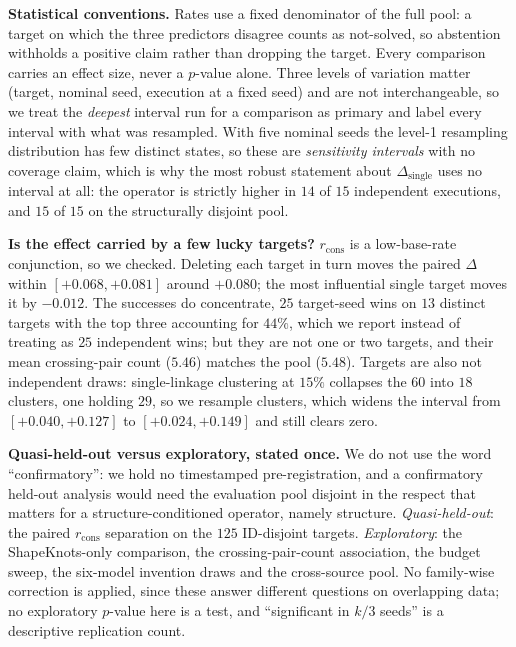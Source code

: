 \documentclass[11pt]{article}
\begin{document}
\smallskip\noindent\textbf{Statistical conventions.} Rates use a fixed denominator of the full pool: a target
on which the three predictors disagree counts as not-solved, so abstention withholds a positive claim rather
than dropping the target. Every comparison carries an effect size, never a $p$-value alone. Three levels of
variation matter (target, nominal seed, execution at a fixed seed) and are not interchangeable, so we treat the
\emph{deepest} interval run for a comparison as primary and label every interval with what was resampled. With
five nominal seeds the level-1 resampling distribution has few distinct states, so these are \emph{sensitivity
intervals} with no coverage claim, which is why the most robust statement about $\Delta_{\mathrm{single}}$ uses
no interval at all: the operator is strictly higher in $14$ of $15$ independent executions, and $15$ of $15$ on
the structurally disjoint pool.

\smallskip\noindent\textbf{Is the effect carried by a few lucky targets?} $r_{\mathrm{cons}}$ is a low-base-rate
conjunction, so we checked. Deleting each target in turn moves the paired $\Delta$ within
$[{+}0.068,{+}0.081]$ around ${+}0.080$; the most influential single target moves it by $-0.012$. The successes
do concentrate, $25$ target-seed wins on $13$ distinct targets with the top three accounting for $44\%$, which we report instead of treating as $25$ independent wins; but they are not one or two targets, and their mean
crossing-pair count ($5.46$) matches the pool ($5.48$). Targets are also not independent draws: single-linkage
clustering at $15\%$ collapses the $60$ into $18$ clusters, one holding $29$, so we resample clusters, which
widens the interval from $[{+}0.040,{+}0.127]$ to $[{+}0.024,{+}0.149]$ and still clears zero.

\smallskip\noindent\textbf{Quasi-held-out versus exploratory, stated once.} We do not use the word
``confirmatory'': we hold no timestamped pre-registration, and a confirmatory held-out analysis would need the
evaluation pool disjoint in the respect that matters for a structure-conditioned operator, namely structure.
\emph{Quasi-held-out}: the paired $r_{\mathrm{cons}}$ separation on the $125$ ID-disjoint targets.
\emph{Exploratory}: the ShapeKnots-only comparison, the crossing-pair-count association, the budget sweep, the
six-model invention draws and the cross-source pool. No family-wise correction is applied, since these answer
different questions on overlapping data; no exploratory $p$-value here is a test, and ``significant in $k/3$
seeds'' is a descriptive replication count.
\end{document}
